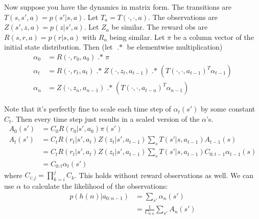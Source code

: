 \documentclass[10pt,english]{article}
\begin{document}
Now suppose you have the dynamics in matrix form. The transitions are $T(s,s',a) = p(s'|s,a)$. Let $T_a = T(\cdot,\cdot,a)$. The observations are $Z(s',z,a) = p(z|s',a)$. Let $Z_a$ be similar. The reward obs are $R(s,r,a) = p(r|s,a)$ with $R_a$ being similar. Let $\pi$ be a column vector of the initial state distribution. Then (let $\operatorname{.*}$ be elementwise multiplication)
\begin{align}
\alpha_0 &= R(\cdot,r_0,a_0) \operatorname{.*} \pi \\
\alpha_t &= R(\cdot, r_t, a_t) \operatorname{.*} Z(\cdot, z_t, a_{t-1}) \operatorname{.*} \left( T(\cdot,\cdot,a_{t-1})^T \alpha_{t-1} \right) \\
\alpha_n &= Z(\cdot, z_n, a_{n-1}) \operatorname{.*} \left( T(\cdot,\cdot,a_{t-n})^T \alpha_{n-1} \right)
\end{align}

Note that it's perfectly fine to scale each time step of $\alpha_t(s')$ by some constant $C_t$. Then every time step just results in a scaled version of the $\alpha$'s.
\begin{align}
A_{0}(s') &= C_0 R(r_{0} | s',a_{0}) \pi(s') \\
A_{t}(s') &= C_t R(r_{t} |s', a_{t}) Z(z_{t} |s', a_{t-1}) \sum_s T(s' |s, a_{t-1}) A_{t-1}(s) \\
&= C_t R(r_{t} |s', a_{t}) Z(z_{t} |s', a_{t-1}) \sum_s T(s' |s, a_{t-1}) C_{0:t-1} \alpha_{t-1}(s) \\
&= C_{0:t}\alpha_t(s')
\end{align}
where $C_{i:j} = \prod_{k=i}^j C_k$. This holds without reward observations as well. We can use $\alpha$ to calculate the likelihood of the observations:
\begin{align}
p(h(n) | a_{0:n-1}) &= \sum_{s'} \alpha_n(s') \\
&= \frac{1}{C_{0:n}} \sum_{s'} A_n(s')
\end{align}
\end{document}
